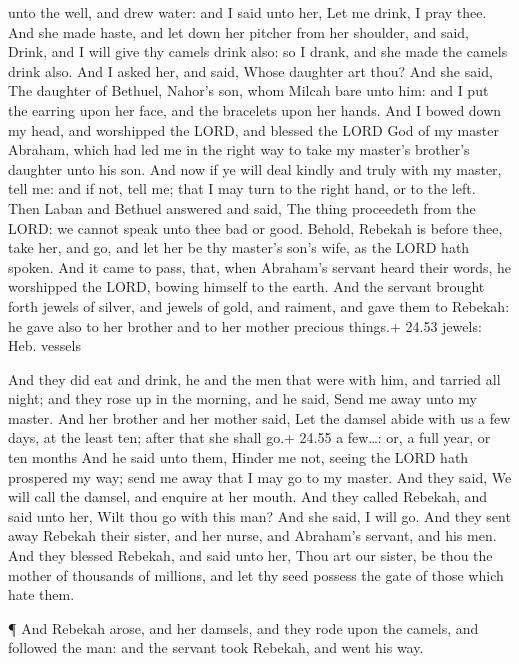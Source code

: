 unto the well, and drew water: and I said unto her, Let me drink, I pray
thee.  And she made haste, and let down her pitcher from
her shoulder, and said, Drink, and I will give thy camels drink also: so
I drank, and she made the camels drink also.  And I asked
her, and said, Whose daughter art thou? And she said, The daughter of
Bethuel, Nahor's son, whom Milcah bare unto him: and I put the earring
upon her face, and the bracelets upon her hands.  And I
bowed down my head, and worshipped the LORD, and blessed the LORD God of
my master Abraham, which had led me in the right way to take my master's
brother's daughter unto his son.  And now if ye will deal
kindly and truly with my master, tell me: and if not, tell me; that I
may turn to the right hand, or to the left.  Then Laban and
Bethuel answered and said, The thing proceedeth from the LORD: we cannot
speak unto thee bad or good.  Behold, Rebekah is before
thee, take her, and go, and let her be thy master's son's wife, as the
LORD hath spoken.  And it came to pass, that, when
Abraham's servant heard their words, he worshipped the LORD, bowing
himself to the earth.  And the servant brought forth jewels
of silver, and jewels of gold, and raiment, and gave them to Rebekah: he
gave also to her brother and to her mother precious things.+ 24.53
jewels: Heb. vessels

 And they did eat and drink, he and the men that were with
him, and tarried all night; and they rose up in the morning, and he
said, Send me away unto my master.  And her brother and her
mother said, Let the damsel abide with us a few days, at the least ten;
after that she shall go.+ 24.55 a few\ldots: or, a full year, or ten
months  And he said unto them, Hinder me not, seeing the
LORD hath prospered my way; send me away that I may go to my master.
 And they said, We will call the damsel, and enquire at her
mouth.  And they called Rebekah, and said unto her, Wilt
thou go with this man? And she said, I will go.  And they
sent away Rebekah their sister, and her nurse, and Abraham's servant,
and his men.  And they blessed Rebekah, and said unto her,
Thou art our sister, be thou the mother of thousands of millions, and
let thy seed possess the gate of those which hate them.

 ¶ And Rebekah arose, and her damsels, and they rode upon
the camels, and followed the man: and the servant took Rebekah, and went
his way.

